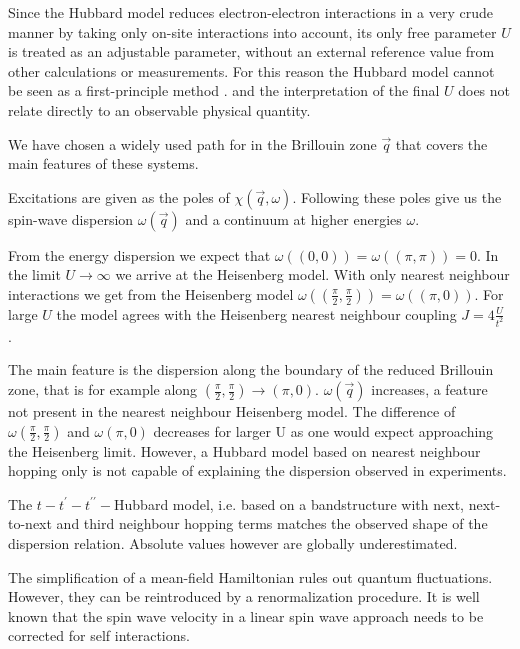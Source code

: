 \documentclass[a4paper,10pt]{report}
\begin{document}
Since the Hubbard model reduces electron-electron interactions in a very crude manner by taking only on-site interactions into account,
its only free parameter $U$ is treated as an adjustable parameter, without an external reference value from other calculations or measurements.	
For this reason the Hubbard model cannot be seen as a first-principle method \cite{J.Phys.Cond.Matter.Vol21.34}.
and the interpretation of the final $U$ does not relate directly to an observable physical quantity.

We have chosen a widely used path for in the Brillouin zone $\vec q$ that covers the main features of these systems.


Excitations are given as the poles of $\chi(\vec q,\omega)$. 
Following these poles give us the spin-wave dispersion $\omega(\vec q)$ and a continuum at higher energies $\omega$.

From the energy dispersion  we expect that $\omega( (0,0) ) = \omega(( \pi,\pi )) = 0$.
In the limit $U\rightarrow \infty$ we arrive at the Heisenberg model. 
With only nearest neighbour interactions we get from the Heisenberg model
$\omega( (\frac{\pi}{2}, \frac{\pi}2 )) = \omega(( \pi,0))$.
For large $U$ the model agrees with the Heisenberg nearest neighbour coupling $J=4\frac{U}{t^2}$ .

The main feature is the dispersion along the boundary of the reduced Brillouin zone, that is for example along $(\frac{\pi}2,\frac{\pi}2) \rightarrow (\pi,0)$.
$\omega(\vec q)$ increases, a feature not present in the nearest neighbour Heisenberg model. 
The difference of $\omega(\frac{\pi}2,\frac{\pi}2)$ and $\omega(\pi,0)$ decreases for larger U as one would expect approaching the Heisenberg limit.
However, a Hubbard model based on nearest neighbour hopping only is not capable of explaining the dispersion observed in experiments.

The $t-t^{\prime}-t^{\prime \prime}-$Hubbard model, 
i.e. based on a bandstructure with next, next-to-next and third neighbour hopping terms 
matches the observed shape of the dispersion relation. 
Absolute values however are globally underestimated.

The simplification of a mean-field Hamiltonian rules out quantum fluctuations.
However, they can be reintroduced by a renormalization procedure.
It is well known 
that the spin wave velocity in a linear spin wave approach needs to be corrected for self interactions.
\end{document}
